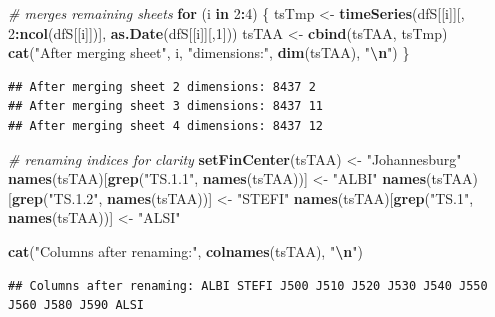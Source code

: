 \documentclass[
  12pt,
]{article}
\newenvironment{Shaded}{\begin{snugshade}}{\end{snugshade}}
\newcommand{\CommentTok}[1]{\textcolor[rgb]{0.56,0.35,0.01}{\textit{#1}}}
\newcommand{\ControlFlowTok}[1]{\textcolor[rgb]{0.13,0.29,0.53}{\textbf{#1}}}
\newcommand{\DecValTok}[1]{\textcolor[rgb]{0.00,0.00,0.81}{#1}}
\newcommand{\FunctionTok}[1]{\textcolor[rgb]{0.13,0.29,0.53}{\textbf{#1}}}
\newcommand{\NormalTok}[1]{#1}
\newcommand{\OtherTok}[1]{\textcolor[rgb]{0.56,0.35,0.01}{#1}}
\newcommand{\SpecialCharTok}[1]{\textcolor[rgb]{0.81,0.36,0.00}{\textbf{#1}}}
\newcommand{\StringTok}[1]{\textcolor[rgb]{0.31,0.60,0.02}{#1}}
\begin{document}
\begin{Shaded}
\begin{Highlighting}[]
\CommentTok{\# merges remaining sheets}
\ControlFlowTok{for}\NormalTok{ (i }\ControlFlowTok{in} \DecValTok{2}\SpecialCharTok{:}\DecValTok{4}\NormalTok{) \{}
\NormalTok{  tsTmp }\OtherTok{\textless{}{-}} \FunctionTok{timeSeries}\NormalTok{(dfS[[i]][, }\DecValTok{2}\SpecialCharTok{:}\FunctionTok{ncol}\NormalTok{(dfS[[i]])], }\FunctionTok{as.Date}\NormalTok{(dfS[[i]][,}\DecValTok{1}\NormalTok{]))}
\NormalTok{  tsTAA }\OtherTok{\textless{}{-}} \FunctionTok{cbind}\NormalTok{(tsTAA, tsTmp)}
  \FunctionTok{cat}\NormalTok{(}\StringTok{"After merging sheet"}\NormalTok{, i, }\StringTok{"dimensions:"}\NormalTok{, }\FunctionTok{dim}\NormalTok{(tsTAA), }\StringTok{"}\SpecialCharTok{\textbackslash{}n}\StringTok{"}\NormalTok{)}
\NormalTok{\}}
\end{Highlighting}
\end{Shaded}

\begin{verbatim}
## After merging sheet 2 dimensions: 8437 2 
## After merging sheet 3 dimensions: 8437 11 
## After merging sheet 4 dimensions: 8437 12
\end{verbatim}

\begin{Shaded}
\begin{Highlighting}[]
\CommentTok{\# renaming indices for clarity}
\FunctionTok{setFinCenter}\NormalTok{(tsTAA) }\OtherTok{\textless{}{-}} \StringTok{"Johannesburg"}
\FunctionTok{names}\NormalTok{(tsTAA)[}\FunctionTok{grep}\NormalTok{(}\StringTok{"TS.1.1"}\NormalTok{, }\FunctionTok{names}\NormalTok{(tsTAA))] }\OtherTok{\textless{}{-}} \StringTok{"ALBI"}
\FunctionTok{names}\NormalTok{(tsTAA)[}\FunctionTok{grep}\NormalTok{(}\StringTok{"TS.1.2"}\NormalTok{, }\FunctionTok{names}\NormalTok{(tsTAA))] }\OtherTok{\textless{}{-}} \StringTok{"STEFI"}
\FunctionTok{names}\NormalTok{(tsTAA)[}\FunctionTok{grep}\NormalTok{(}\StringTok{"TS.1"}\NormalTok{, }\FunctionTok{names}\NormalTok{(tsTAA))] }\OtherTok{\textless{}{-}} \StringTok{"ALSI"}

\FunctionTok{cat}\NormalTok{(}\StringTok{"Columns after renaming:"}\NormalTok{, }\FunctionTok{colnames}\NormalTok{(tsTAA), }\StringTok{"}\SpecialCharTok{\textbackslash{}n}\StringTok{"}\NormalTok{)}
\end{Highlighting}
\end{Shaded}

\begin{verbatim}
## Columns after renaming: ALBI STEFI J500 J510 J520 J530 J540 J550 J560 J580 J590 ALSI
\end{verbatim}
\end{document}
